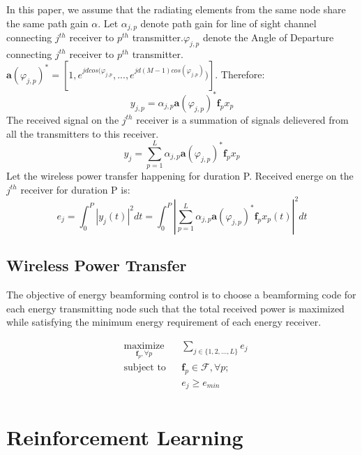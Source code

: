 \documentclass[journal]{IEEEtran}
\begin{document}
In this paper, we assume that the radiating elements from the same node share the same path gain $\alpha$. Let $\alpha_{j,p}$ denote path gain for line of sight channel connecting $j^{th}$ receiver to $p^{th}$ transmitter.$\varphi_{j,p}$ denote the Angle of Departure connecting $j^{th}$ receiver to $p^{th}$ transmitter. $\textbf{a}(\varphi_{j,p})^*=[1,e^{jdcos(\varphi_{j,p}},...,e^{jd(M-1)cos(\varphi_{j,p})})]$. Therefore:
\begin{equation}
y_{j,p}=\alpha_{j,p} \textbf{a}(\varphi_{j,p})^* \textbf{f}_p x_p
\end{equation}
The received signal on the $j^{th}$ receiver is a summation of signals delievered from all the transmitters to this receiver.
\begin{equation}
y_j=\sum_{p=1}^L \alpha_{j,p} \textbf{a}(\varphi_{j,p})^* \textbf{f}_p x_p
\end{equation}
Let the wireless power transfer happening for duration P. Received energe on the $j^{th}$ receiver for duration P is:
\begin{equation}
e_j=\int_0^P |y_j(t)|^2 dt=\int_0^P |\sum_{p=1}^L \alpha_{j,p} \textbf{a}(\varphi_{j,p})^* \textbf{f}_p x_p(t)|^2 dt
\end{equation}

\subsection{Wireless Power Transfer}

The objective of energy beamforming control is to choose a beamforming code for each energy transmitting node such that the total received power is maximized while satisfying the minimum energy requirement of each energy receiver.

\begin{equation*}
    \begin{aligned}
        & \underset{ \textbf{f}_p, \forall p}{\text{maximize}}
        && \displaystyle\sum_{j \in \{1,2,...,L\}} e_j\\
        & \text{subject to}
        && \textbf{f}_p \in \mathcal{F}, \forall p;\\
        &&& e_j \geq e_{min}\\
    \end{aligned}
\end{equation*}


\section{Reinforcement Learning}
\end{document}
